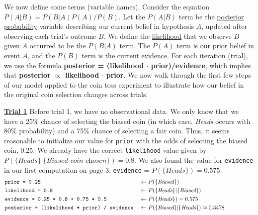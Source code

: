 We now define some terms (variable names). Consider the equation $P(A|B) = P(B|A)P(A)/P(B)$. Let the $P(A|B)$ term be the \href{https://en.wikipedia.org/wiki/Posterior_probability}{posterior probability} variable describing our current belief in hypothesis $A$, updated after observing each trial's outcome $B$. We define the \href{https://en.wikipedia.org/wiki/Likelihood_function}{likelihood} that we observe $B$ given $A$ occurred to be the $P(B|A)$ term. The $P(A)$ term is our \href{https://en.wikipedia.org/wiki/Prior_probability}{prior} belief in event $A$, and the $P(B)$ term is the current \href{https://en.wikipedia.org/wiki/Marginal_likelihood}{evidence}. For each iteration (trial), we use the formula \textbf{posterior = (likelihood $\cdot$ prior)/evidence}, which implies that \textbf{posterior $\propto$ likelihood $\cdot$ prior}. We now walk through the first few steps of our model applied to the coin toss experiment to illustrate how our belief in the original coin selection changes across trials.

\vspace{3 mm}
\underline{\textbf{Trial 1}}
\newline
Before trial 1, we have no observational data. We only know that we have a 25\% chance of selecting the biased coin (in which case, \textit{Heads} occurs with 80\% probability) and a 75\% chance of selecting a fair coin. Thus, it seems reasonable to initialize our value for \texttt{prior} with the odds of selecting the biased coin, 0.25. We already have the correct \texttt{likelihood} value given by $P(\{\textit{Heads}\}|\{\textit{Biased coin chosen}\}) = 0.8$. We also found the value for \texttt{evidence} in our first computation on page 3: \texttt{evidence} = $P(\{\textit{Heads}\}) = 0.575$. 
\begin{align*}
    &\texttt{prior = 0.25} &&\leftarrow P(\{\textit{Biased}\}) \\
    &\texttt{likelihood = 0.8} &&\leftarrow P(\{\textit{Heads}\} | \{\textit{Biased}\}) \\
    &\texttt{evidence = 0.25 * 0.8 + 0.75 * 0.5} &&\leftarrow P(\{\textit{Heads}\}) = 0.575 \\
    &\texttt{posterior = (likelihood * prior) / evidence} &&\leftarrow P(\{\textit{Biased}\} | \{\textit{Heads}\}) \approx 0.3478 \hspace{18 mm} 
\end{align*}

